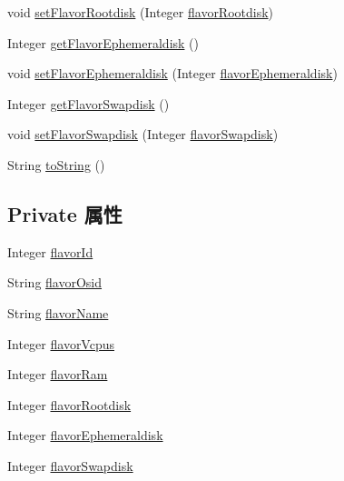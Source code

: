 \begin{DoxyCompactItemize}
void \mbox{\hyperlink{classcom_1_1example_1_1demo_1_1modular_1_1_flavor_a0bc3d5e979326abc259970d8894f3364}{set\+Flavor\+Rootdisk}} (Integer \mbox{\hyperlink{classcom_1_1example_1_1demo_1_1modular_1_1_flavor_aeffb12398b331a1b9e426546a0bf60d5}{flavor\+Rootdisk}})
\item 
Integer \mbox{\hyperlink{classcom_1_1example_1_1demo_1_1modular_1_1_flavor_a93c96ae48e8753ac6c121b3202c8f218}{get\+Flavor\+Ephemeraldisk}} ()
\item 
void \mbox{\hyperlink{classcom_1_1example_1_1demo_1_1modular_1_1_flavor_a928cfe9a022d12a10a96c9df1f2fd16d}{set\+Flavor\+Ephemeraldisk}} (Integer \mbox{\hyperlink{classcom_1_1example_1_1demo_1_1modular_1_1_flavor_a344782ea913e47b1a2eadca2fa9dab22}{flavor\+Ephemeraldisk}})
\item 
Integer \mbox{\hyperlink{classcom_1_1example_1_1demo_1_1modular_1_1_flavor_a80f51d81562087af499d254cd9db2814}{get\+Flavor\+Swapdisk}} ()
\item 
void \mbox{\hyperlink{classcom_1_1example_1_1demo_1_1modular_1_1_flavor_a8f14920aa07bfaba9fc0e679f5c6eece}{set\+Flavor\+Swapdisk}} (Integer \mbox{\hyperlink{classcom_1_1example_1_1demo_1_1modular_1_1_flavor_aaf9949698de88871632616e0170c8aee}{flavor\+Swapdisk}})
\item 
String \mbox{\hyperlink{classcom_1_1example_1_1demo_1_1modular_1_1_flavor_aa28e97722dca71d88a20617d5479b503}{to\+String}} ()
\end{DoxyCompactItemize}
\subsection*{Private 属性}
\begin{DoxyCompactItemize}
\item 
Integer \mbox{\hyperlink{classcom_1_1example_1_1demo_1_1modular_1_1_flavor_aa6d327ab2dbe6e2fe8dbd67f467c30c7}{flavor\+Id}}
\item 
String \mbox{\hyperlink{classcom_1_1example_1_1demo_1_1modular_1_1_flavor_a7d9900a2a3fde061bb866a273cbee78a}{flavor\+Osid}}
\item 
String \mbox{\hyperlink{classcom_1_1example_1_1demo_1_1modular_1_1_flavor_aeec6be20b22e2c0de56ce89626a1b1c8}{flavor\+Name}}
\item 
Integer \mbox{\hyperlink{classcom_1_1example_1_1demo_1_1modular_1_1_flavor_a54e7ce2a17f9f8b5427d35ab59366734}{flavor\+Vcpus}}
\item 
Integer \mbox{\hyperlink{classcom_1_1example_1_1demo_1_1modular_1_1_flavor_ae6bc06cd7fe878a5d958edba57adfcc2}{flavor\+Ram}}
\item 
Integer \mbox{\hyperlink{classcom_1_1example_1_1demo_1_1modular_1_1_flavor_aeffb12398b331a1b9e426546a0bf60d5}{flavor\+Rootdisk}}
\item 
Integer \mbox{\hyperlink{classcom_1_1example_1_1demo_1_1modular_1_1_flavor_a344782ea913e47b1a2eadca2fa9dab22}{flavor\+Ephemeraldisk}}
\item 
Integer \mbox{\hyperlink{classcom_1_1example_1_1demo_1_1modular_1_1_flavor_aaf9949698de88871632616e0170c8aee}{flavor\+Swapdisk}}
\end{DoxyCompactItemize}



